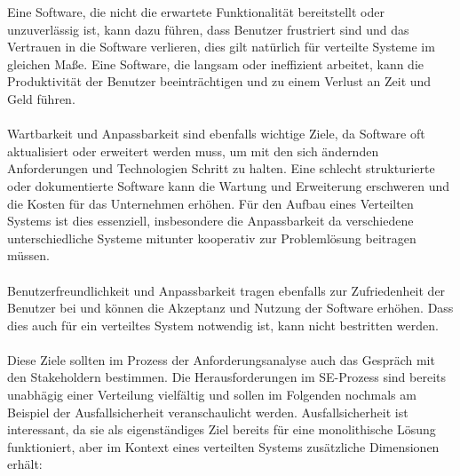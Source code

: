 \documentclass[../vs-script-first-v01.tex]{subfiles}
\begin{document}
Eine Software, die nicht die erwartete Funktionalität bereitstellt oder unzuverlässig ist, kann dazu führen, dass Benutzer frustriert sind und das Vertrauen in die Software verlieren, dies gilt natürlich für verteilte Systeme im gleichen Maße. Eine Software, die langsam oder ineffizient arbeitet, kann die Produktivität der Benutzer beeinträchtigen und zu einem Verlust an Zeit und Geld führen.
\\\\
Wartbarkeit und Anpassbarkeit sind ebenfalls wichtige Ziele, da Software oft aktualisiert oder erweitert werden muss, um mit den sich ändernden Anforderungen und Technologien Schritt zu halten. Eine schlecht strukturierte oder dokumentierte Software kann die Wartung und Erweiterung erschweren und die Kosten für das Unternehmen erhöhen. Für den Aufbau eines Verteilten Systems ist dies essenziell, insbesondere die Anpassbarkeit da verschiedene unterschiedliche Systeme mitunter kooperativ zur Problemlösung beitragen müssen.
\\\\
Benutzerfreundlichkeit und Anpassbarkeit tragen ebenfalls zur Zufriedenheit der Benutzer bei und können die Akzeptanz und Nutzung der Software erhöhen. Dass dies auch für ein verteiltes System notwendig ist, kann nicht bestritten werden.
\\\\
Diese Ziele sollten im Prozess der Anforderungsanalyse auch das Gespräch mit den Stakeholdern bestimmen. 
Die Herausforderungen im SE-Prozess sind bereits unabhägig einer Verteilung vielfältig und sollen im Folgenden nochmals am Beispiel der Ausfallsicherheit veranschaulicht werden. Ausfallsicherheit ist interessant, da sie als eigenständiges Ziel bereits für eine monolithische Lösung funktioniert, aber im Kontext eines verteilten Systems zusätzliche Dimensionen erhält:
\end{document}
